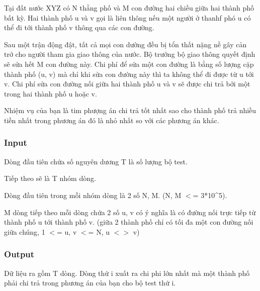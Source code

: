 

Tại đất nước XYZ có N thằng phố và M con đường hai chiều giữa hai thành phố bất kỳ. Hai thành phố u và v gọi là liên thông nếu một người ở thanhf phó u có thể đi tới thành phố v thông qua các con đường.

Sau một trận động đật, tất cả mọi con dường đều bị tổn thất nặng nề gây cản trở cho người tham gia giao thông của nước. Bộ trưởng bộ giao thông quyết định sẽ sửa hết M con đường này. Chi phí để sửa một con đường là bằng số lượng cặp thành phố (u, v) mà chỉ khi sửa con đường này thì ta không thể đi được từ u tới v. Chi phí sửa con đường nối giữa hai thành phố u và v sẽ được chi trả bởi một trong hai thành phố u hoặc v.

Nhiệm vụ của bạn là tim phượng án chi trả tốt nhất sao cho thành phố trả nhiều tiền nhất trong phương án đó là nhỏ nhất so với các phương án khác.

\subsubsection{Input}

Dòng đầu tiên chứa số nguyên dương T là số lượng bộ test.

Tiếp theo sẽ là T nhóm dòng.

Dòng đầu tiên trong mỗi nhóm dòng là 2 số N, M. (N, M $<$= 3*10\textasciicircum5).

M dòng tiếp theo mỗi dòng chứa 2 số u, v có ý nghĩa là có đường nối trực tiếp từ thành phố u tới thành phố v. (giữa 2 thành phố chỉ có tối đa một con đường nối giữa chúng, 1 $<$= u, v $<$= N, u $<$$>$ v)

\subsubsection{Output}

Dữ liệu ra gồm T dòng. Dòng thứ i xuất ra chi phi lớn nhất mà một thành phố phải chi trả trong phương án của bạn cho bộ test thứ i.

